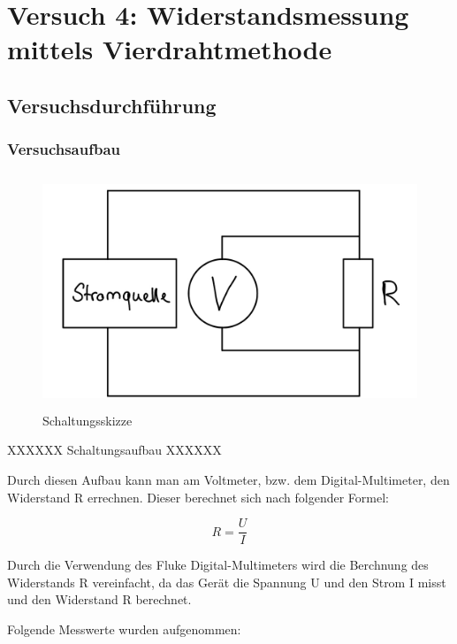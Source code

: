 \chapter{Versuch 4: Widerstandsmessung mittels Vierdrahtmethode}

\section{Versuchsdurchführung}

\subsection{Versuchsaufbau}

\begin{figure}[H]
	\centering
	\includegraphics[height=7cm]{images/Versuch4/Schaltskizze.jpeg}
	\caption{Schaltungsskizze}
	\label{fig: Schaltungsskizze}
\end{figure}

XXXXXX Schaltungsaufbau XXXXXX

Durch diesen Aufbau kann man am Voltmeter, bzw. dem Digital-Multimeter,
den Widerstand R errechnen. Dieser berechnet sich nach folgender Formel:

\begin{equation}
    R = \frac{U}{I}
    \label{eq:R}
\end{equation}

Durch die Verwendung des Fluke Digital-Multimeters wird die
Berchnung des Widerstands R vereinfacht, da das Gerät die Spannung U
und den Strom I misst und den Widerstand R berechnet.

Folgende Messwerte wurden aufgenommen:

